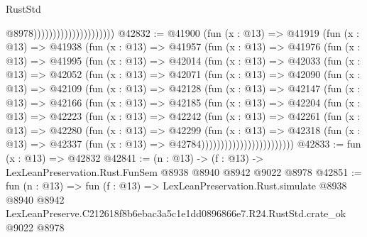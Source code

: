 \begin{lexlean}{RustStd}
\begin{coremodule}
                                              @8978)))))))))))))))))))))
@42832 := @41900
    (fun (x : @13) =>
    @41919
      (fun (x : @13) =>
      @41938
        (fun (x : @13) =>
        @41957
          (fun (x : @13) =>
          @41976
            (fun (x : @13) =>
            @41995
              (fun (x : @13) =>
              @42014
                (fun (x : @13) =>
                @42033
                  (fun (x : @13) =>
                  @42052
                    (fun (x : @13) =>
                    @42071
                      (fun (x : @13) =>
                      @42090
                        (fun (x : @13) =>
                        @42109
                          (fun (x : @13) =>
                          @42128
                            (fun (x : @13) =>
                            @42147
                              (fun (x : @13) =>
                              @42166
                                (fun (x : @13) =>
                                @42185
                                  (fun (x : @13) =>
                                  @42204
                                    (fun (x : @13) =>
                                    @42223
                                      (fun (x : @13) =>
                                      @42242
                                        (fun (x : @13) =>
                                        @42261
                                          (fun (x : @13) =>
                                          @42280
                                            (fun (x : @13) =>
                                            @42299
                                              (fun (x : @13) =>
                                              @42318
                                                (fun (x : @13) =>
                                                @42337
                                                  (fun (x : @13) => @42784))))))))))))))))))))))))
@42833 := fun (x : @13) => @42832
@42841 := (n : @13) -> (f : @13) -> LexLeanPreservation.Rust.FunSem @8938 @8940 @8942 @9022 @8978
@42851 := fun (n : @13) =>
  fun (f : @13) =>
  LexLeanPreservation.Rust.simulate
    @8938
    @8940
    @8942
    LexLeanPreserve.C212618f8b6ebac3a5c1e1dd0896866e7.R24.RustStd.crate_ok
    @9022
    @8978
\end{coremodule}
\end{lexlean}

